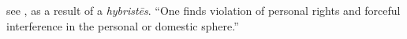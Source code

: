 \item[Forceful interference,]

see , as a result of a \emph{hybristēs}. ``One finds violation of personal rights and forceful interference in the personal or domestic sphere.''
